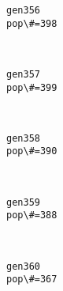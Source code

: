 \documentclass[11pt]{article}
\begin{document}
    \begin{Verbatim}[commandchars=\\\{\}]
gen356
pop\#=398

    \end{Verbatim}

    \begin{center}
    \end{center}
    { \hspace*{\fill} \\}
    
    \begin{Verbatim}[commandchars=\\\{\}]
gen357
pop\#=399

    \end{Verbatim}

    \begin{center}
    \end{center}
    { \hspace*{\fill} \\}
    
    \begin{Verbatim}[commandchars=\\\{\}]
gen358
pop\#=390

    \end{Verbatim}

    \begin{center}
    \end{center}
    { \hspace*{\fill} \\}
    
    \begin{Verbatim}[commandchars=\\\{\}]
gen359
pop\#=388

    \end{Verbatim}

    \begin{center}
    \end{center}
    { \hspace*{\fill} \\}
    
    \begin{Verbatim}[commandchars=\\\{\}]
gen360
pop\#=367

    \end{Verbatim}
\end{document}
